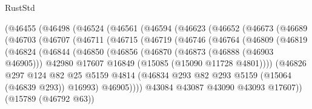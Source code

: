 \begin{lexlean}{RustStd}
\begin{coremodule}
            (@46455
              (@46498
                (@46524
                  (@46561
                    (@46594
                      (@46623
                        (@46652
                          (@46673
                            (@46689
                              (@46703
                                (@46707
                                  (@46711
                                    (@46715
                                      (@46719
                                        (@46746
                                          (@46764
                                            (@46809
                                              (@46819
                                                (@46824
                                                  (@46844
                                                    (@46850
                                                      (@46856
                                                        (@46870
                                                          (@46873 (@46888 (@46903 @46905)))
                                                          @42980
                                                          @17607
                                                          @16849
                                                          (@15085 (@15090 @11728 @4801))))
                                                      (@46826
                                                        @297
                                                        @124
                                                        @82
                                                        @25
                                                        @5159
                                                        @4814
                                                        (@46834
                                                          @293
                                                          @82
                                                          @293
                                                          @5159
                                                          (@15064 (@46839 @293))
                                                          @16993)
                                                        @46905))))
                                                @43084
                                                @43087
                                                @43090
                                                @43093
                                                @17607))
                                            (@15789 (@46792 @63))

\end{coremodule}
\end{lexlean}
